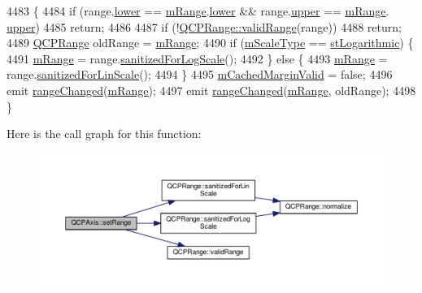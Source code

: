 \begin{DoxyCode}
4483                                             \{
4484   \textcolor{keywordflow}{if} (range.\hyperlink{class_q_c_p_range_aa3aca3edb14f7ca0c85d912647b91745}{lower} == \hyperlink{class_q_c_p_axis_a1ee36773c49062d751560e11f90845f7}{mRange}.\hyperlink{class_q_c_p_range_aa3aca3edb14f7ca0c85d912647b91745}{lower} && range.\hyperlink{class_q_c_p_range_ae44eb3aafe1d0e2ed34b499b6d2e074f}{upper} == \hyperlink{class_q_c_p_axis_a1ee36773c49062d751560e11f90845f7}{mRange}.
      \hyperlink{class_q_c_p_range_ae44eb3aafe1d0e2ed34b499b6d2e074f}{upper})
4485     \textcolor{keywordflow}{return};
4486 
4487   \textcolor{keywordflow}{if} (!\hyperlink{class_q_c_p_range_ab38bd4841c77c7bb86c9eea0f142dcc0}{QCPRange::validRange}(range))
4488     \textcolor{keywordflow}{return};
4489   \hyperlink{class_q_c_p_range}{QCPRange} oldRange = \hyperlink{class_q_c_p_axis_a1ee36773c49062d751560e11f90845f7}{mRange};
4490   \textcolor{keywordflow}{if} (\hyperlink{class_q_c_p_axis_ad706039549cbbbec5fcb2baf7894e04d}{mScaleType} == \hyperlink{class_q_c_p_axis_a36d8e8658dbaa179bf2aeb973db2d6f0abf5b785ad976618816dc6f79b73216d4}{stLogarithmic}) \{
4491     \hyperlink{class_q_c_p_axis_a1ee36773c49062d751560e11f90845f7}{mRange} = range.\hyperlink{class_q_c_p_range_aaf6a9046e78d91eeb8e89584fe46b034}{sanitizedForLogScale}();
4492   \} \textcolor{keywordflow}{else} \{
4493     \hyperlink{class_q_c_p_axis_a1ee36773c49062d751560e11f90845f7}{mRange} = range.\hyperlink{class_q_c_p_range_a1ff029704c29a75adbc1dc36cecaf44c}{sanitizedForLinScale}();
4494   \}
4495   \hyperlink{class_q_c_p_axis_a2cde37b6e385f47e11322df4ac1b0e9b}{mCachedMarginValid} = \textcolor{keyword}{false};
4496   emit \hyperlink{class_q_c_p_axis_a0894084e4c16a1736534c4095746f910}{rangeChanged}(\hyperlink{class_q_c_p_axis_a1ee36773c49062d751560e11f90845f7}{mRange});
4497   emit \hyperlink{class_q_c_p_axis_a0894084e4c16a1736534c4095746f910}{rangeChanged}(\hyperlink{class_q_c_p_axis_a1ee36773c49062d751560e11f90845f7}{mRange}, oldRange);
4498 \}
\end{DoxyCode}


Here is the call graph for this function\+:\nopagebreak
\begin{figure}[H]
\begin{center}
\leavevmode
\includegraphics[width=350pt]{class_q_c_p_axis_aebdfea5d44c3a0ad2b4700cd4d25b641_cgraph}
\end{center}
\end{figure}




